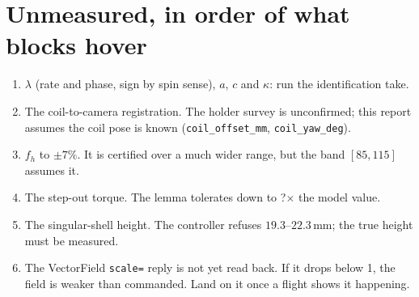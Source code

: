 \documentclass[11pt]{article}
\newcommand{\lockTorqueScale}{?}\newcommand{\certLeakC}{?}\newcommand{\certLeakD}{?}%
\begin{document}
\section{Unmeasured, in order of what blocks hover}
\begin{enumerate}[leftmargin=*]
\item $\lambda$ (rate and phase, sign by spin sense), $a$, $c$ and $\kappa$: run the identification take.
\item The coil-to-camera registration. The holder survey is unconfirmed; this report assumes the
  coil pose is known (\texttt{coil\_offset\_mm}, \texttt{coil\_yaw\_deg}).
\item $f_h$ to $\pm7\%$. It is certified over a much wider range, but the band $[85,115]$ assumes it.
\item The step-out torque. The lemma tolerates down to \lockTorqueScale$\times$ the model value.
\item The singular-shell height. The controller refuses $19.3$--$22.3$\,mm; the true height must be measured.
\item The VectorField \texttt{scale=} reply is not yet read back. If it drops below 1, the field is
  weaker than commanded. Land on it once a flight shows it happening.
\end{enumerate}
\end{document}
